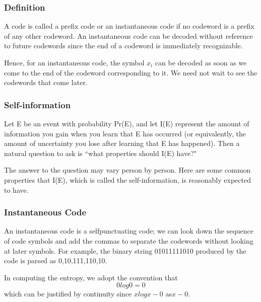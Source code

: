 \documentclass[a4]{beamer}
\begin{document}
\begin{frame}
\frametitle{Definition} A code is called a prefix code or an instantaneous code if
no codeword is a prefix of any other codeword.
An instantaneous code can be decoded without reference to future codewords
since the end of a codeword is immediately recognizable. 

Hence,
for an instantaneous code, the symbol $x_i$ can be decoded as soon as we
come to the end of the codeword corresponding to it. We need not wait
to see the codewords that come later. 
\end{frame}
\begin{frame}
\frametitle{Self-information}

Let E be an event with probability Pr(E), and let I(E) represent the amount
of information you gain when you learn that E has occurred (or equivalently,
the amount of uncertainty you lose after learning that E has happened). Then
a natural question to ask is ``what properties should I(E) have?" 

The answer
to the question may vary person by person. Here are some common properties
that I(E), which is called the self-information, is reasonably expected to have.

\end{frame}
\begin{frame}
\frametitle{Instantaneous Code}
An instantaneous code is a selfpunctuating
code; we can look down the sequence of code symbols and
add the commas to separate the codewords without looking at later symbols.
For example, the binary string 01011111010 produced by the code
is parsed as 0,10,111,110,10.
\end{frame}
\begin{frame}
In computing the entropy, we adopt the convention that
\[0  log 0 = 0\]
which can be justified by continuity since $x log x - 0$ as$ x - 0$.

\end{frame}
\end{document}
